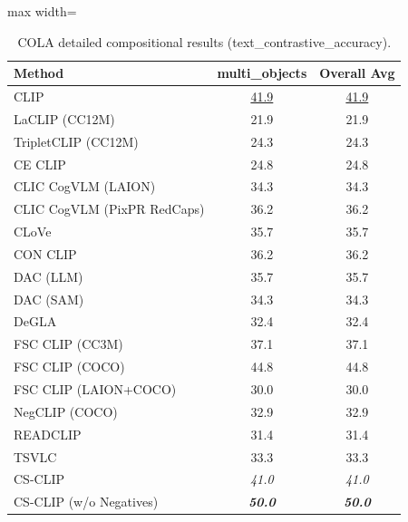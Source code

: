 \begin{table}[t]
  \centering
  \scriptsize
  \caption{COLA detailed compositional results (text_contrastive_accuracy).}
  \label{tab:COLA_detailed}
  \begin{adjustbox}{max width=\textwidth}
  \setlength{\tabcolsep}{2pt}
  \begin{tabular}{p{5cm}c|c}
    \toprule
    Method & multi\_objects & Overall Avg \\
    \midrule
    CLIP & \underline{41.9} & \underline{41.9} \\
    \midrule
    LaCLIP (CC12M) & 21.9 & 21.9 \\
    TripletCLIP (CC12M) & 24.3 & 24.3 \\
    \midrule
    CE CLIP & 24.8 & 24.8 \\
    CLIC CogVLM (LAION) & 34.3 & 34.3 \\
    CLIC CogVLM (PixPR RedCaps) & 36.2 & 36.2 \\
    CLoVe & 35.7 & 35.7 \\
    CON CLIP & 36.2 & 36.2 \\
    DAC (LLM) & 35.7 & 35.7 \\
    DAC (SAM) & 34.3 & 34.3 \\
    DeGLA & 32.4 & 32.4 \\
    FSC CLIP (CC3M) & 37.1 & 37.1 \\
    FSC CLIP (COCO) & 44.8 & 44.8 \\
    FSC CLIP (LAION+COCO) & 30.0 & 30.0 \\
    NegCLIP (COCO) & 32.9 & 32.9 \\
    READCLIP & 31.4 & 31.4 \\
    TSVLC & 33.3 & 33.3 \\
    \midrule
    CS-CLIP & \emph{41.0} & \emph{41.0} \\
    CS-CLIP (w/o Negatives) & \emph{\textbf{50.0}} & \emph{\textbf{50.0}} \\
    \bottomrule
  \end{tabular}
  \end{adjustbox}
\end{table}